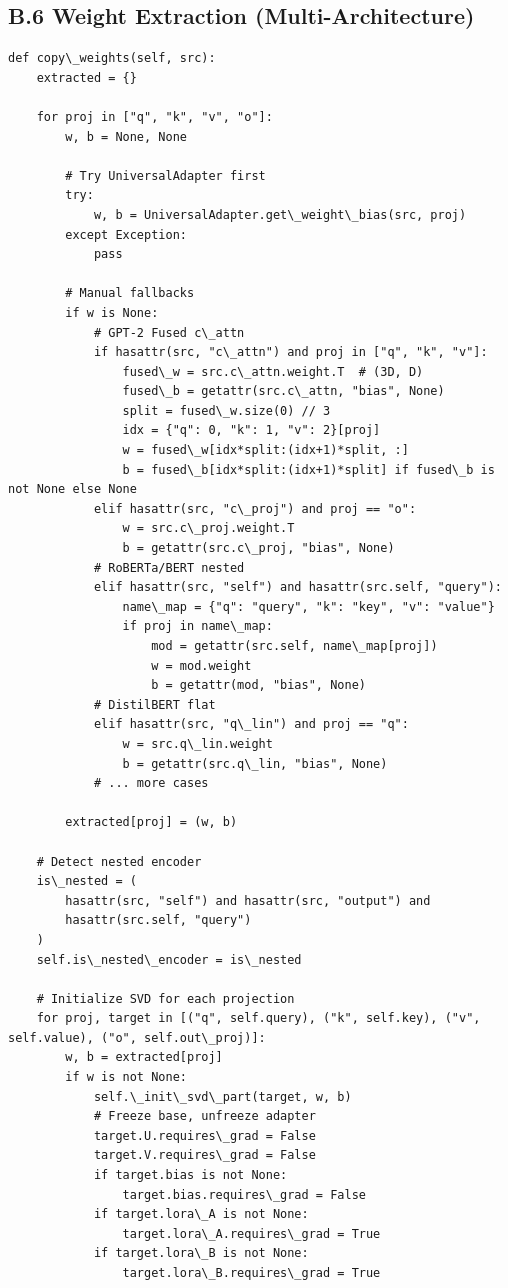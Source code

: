 \subsection{B.6 Weight Extraction (Multi-Architecture)}

\begin{lstlisting}
def copy\_weights(self, src):
    extracted = {}
    
    for proj in ["q", "k", "v", "o"]:
        w, b = None, None
        
        # Try UniversalAdapter first
        try:
            w, b = UniversalAdapter.get\_weight\_bias(src, proj)
        except Exception:
            pass
        
        # Manual fallbacks
        if w is None:
            # GPT-2 Fused c\_attn
            if hasattr(src, "c\_attn") and proj in ["q", "k", "v"]:
                fused\_w = src.c\_attn.weight.T  # (3D, D)
                fused\_b = getattr(src.c\_attn, "bias", None)
                split = fused\_w.size(0) // 3
                idx = {"q": 0, "k": 1, "v": 2}[proj]
                w = fused\_w[idx*split:(idx+1)*split, :]
                b = fused\_b[idx*split:(idx+1)*split] if fused\_b is not None else None
            elif hasattr(src, "c\_proj") and proj == "o":
                w = src.c\_proj.weight.T
                b = getattr(src.c\_proj, "bias", None)
            # RoBERTa/BERT nested
            elif hasattr(src, "self") and hasattr(src.self, "query"):
                name\_map = {"q": "query", "k": "key", "v": "value"}
                if proj in name\_map:
                    mod = getattr(src.self, name\_map[proj])
                    w = mod.weight
                    b = getattr(mod, "bias", None)
            # DistilBERT flat
            elif hasattr(src, "q\_lin") and proj == "q":
                w = src.q\_lin.weight
                b = getattr(src.q\_lin, "bias", None)
            # ... more cases
        
        extracted[proj] = (w, b)
    
    # Detect nested encoder
    is\_nested = (
        hasattr(src, "self") and hasattr(src, "output") and
        hasattr(src.self, "query")
    )
    self.is\_nested\_encoder = is\_nested
    
    # Initialize SVD for each projection
    for proj, target in [("q", self.query), ("k", self.key), ("v", self.value), ("o", self.out\_proj)]:
        w, b = extracted[proj]
        if w is not None:
            self.\_init\_svd\_part(target, w, b)
            # Freeze base, unfreeze adapter
            target.U.requires\_grad = False
            target.V.requires\_grad = False
            if target.bias is not None:
                target.bias.requires\_grad = False
            if target.lora\_A is not None:
                target.lora\_A.requires\_grad = True
            if target.lora\_B is not None:
                target.lora\_B.requires\_grad = True
\end{lstlisting}

